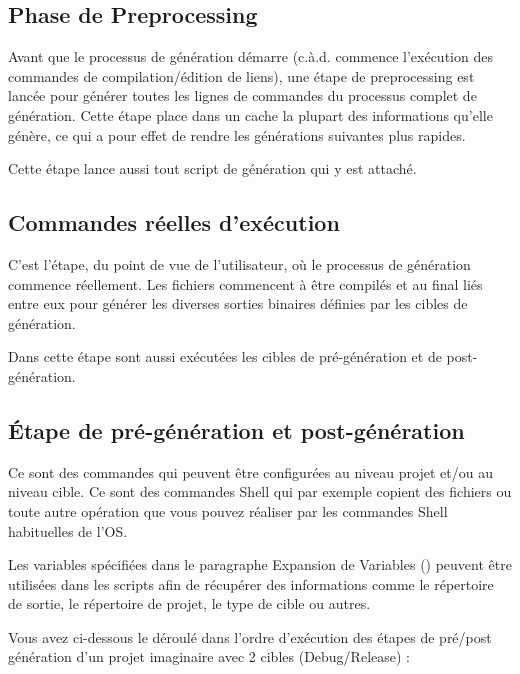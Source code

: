 \subsection{Phase de Preprocessing}

Avant que le processus de génération démarre (c.à.d. commence l'exécution des commandes de compilation/édition de liens), une étape de preprocessing est lancée pour générer toutes les lignes de commandes du processus complet de génération. Cette étape place dans un cache la plupart des informations qu'elle génère, ce qui a pour effet de rendre les générations suivantes plus rapides.

Cette étape lance aussi tout script de génération qui y est attaché.


\subsection{Commandes réelles d'exécution}

C'est l'étape, du point de vue de l'utilisateur, où le processus de génération commence réellement. Les fichiers commencent à être compilés et au final liés entre eux pour générer les diverses sorties binaires définies par les cibles de génération.

Dans cette étape sont aussi exécutées les cibles de pré-génération et de post-génération.


\subsection{Étape de pré-génération et post-génération}

Ce sont des commandes qui peuvent être configurées au niveau projet et/ou au niveau cible. Ce sont des commandes Shell qui par exemple copient des fichiers ou toute autre opération que vous pouvez réaliser par les commandes Shell habituelles de l'OS.

Les variables spécifiées dans le paragraphe Expansion de Variables () peuvent être utilisées dans les scripts afin de récupérer des informations comme le répertoire de sortie, le répertoire de projet, le type de cible ou autres.

Vous avez ci-dessous le déroulé dans l'ordre d'exécution des étapes de pré/post génération d'un projet imaginaire avec 2 cibles (Debug/Release) :

